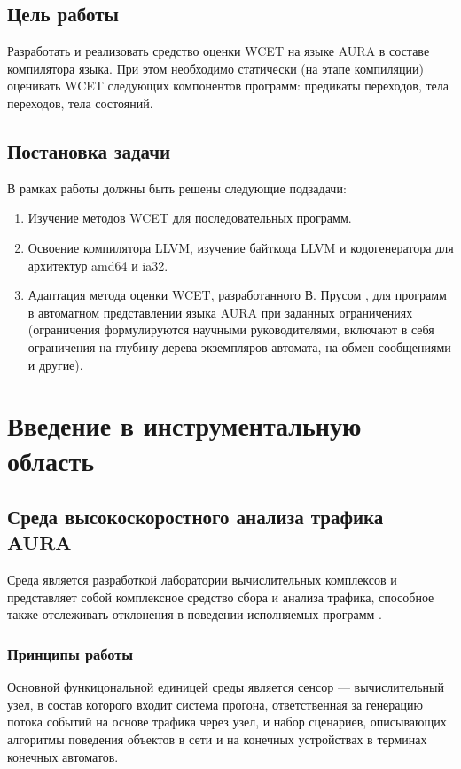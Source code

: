 \documentclass[12pt,a4paper]{article}
\begin{document}
\subsection{Цель работы}
Разработать и реализовать средство оценки WCET на языке AURA в составе компилятора языка.
При этом необходимо статически (на этапе компиляции) оценивать WCET следующих компонентов программ: предикаты переходов, тела переходов, тела состояний.

\subsection{Постановка задачи}
В рамках работы должны быть решены следующие подзадачи:

\begin{enumerate}
\item Изучение методов WCET для последовательных программ.
\item Освоение компилятора LLVM, изучение байткода LLVM и кодогенератора для архитектур amd64 и ia32.
\item Адаптация метода оценки WCET, разработанного В. Прусом \cite{prus}, для программ в автоматном представлении языка AURA при заданных ограничениях (ограничения формулируются научными руководителями, включают в себя ограничения на глубину дерева экземпляров автомата, на обмен сообщениями и другие).
\end{enumerate}

\newpage

\section{Введение в инструментальную область}

\subsection{Среда высокоскоростного анализа трафика AURA}
Среда является разработкой лаборатории вычислительных комплексов и представляет собой комплексное средство сбора и анализа трафика, способное также отслеживать отклонения в поведении исполняемых программ \cite{gamajun}.

\subsubsection{Принципы работы}
Основной функицональной единицей среды является сенсор --- вычислительный узел, в состав которого входит система прогона, ответственная за генерацию потока событий на основе трафика через узел, и набор сценариев, описывающих алгоритмы поведения объектов в сети и на конечных устройствах в терминах конечных автоматов.
\end{document}
